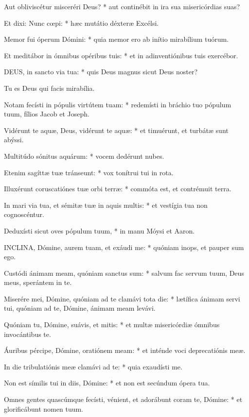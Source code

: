 Aut obliviscétur misceréri Deus? * aut continébit in ira sua misericórdias suas?

Et dixi: Nunc cœpi: * hæc mutátio déxteræ Excélsi.

Memor fui óperum Dómini: * quia memor ero ab inítio mirabílium tuórum.

Et meditábor in ómnibus opéribus tuis: * et in adinventiónibus tuis exercébor.


\lettrine[lines=2]{D}{EUS}, in sancto via tua: * quis Deus magnus sicut Deus noster?

Tu es Deus qui facis mirabília.

Notam fecísti in pópulis virtútem tuam: * redemísti in bráchio tuo pópulum tuum, fílios Jacob et Joseph.

Vidérunt te aquæ, Deus, vidérunt te aquæ: * et timuérunt, et turbátæ sunt abýssi.

Multitúdo sónitus aquárum: * vocem dedérunt nubes.

Etenim sagíttæ tuæ tránseunt: * vox tonítrui tui in rota.

Illuxérunt coruscatiónes tuæ orbi terræ: * commóta est, et contrémuit terra.

In mari via tua, et sémitæ tuæ in aquis multis: * et vestígia tua non cognoscéntur.

Deduxísti sicut oves pópulum tuum, * in manu Móysi et Aaron.


\lettrine[lines=2]{I}{NCLINA}, Dómine, aurem tuam, et exáudi me: * quóniam inops, et pauper sum ego.

Custódi ánimam meam, quóniam sanctus sum: * salvum fac servum tuum, Deus meus, sperántem in te.

Miserére mei, Dómine, quóniam ad te clamávi tota die: * lætífica ánimam servi tui, quóniam ad te, Dómine, ánimam meam levávi.

Quóniam tu, Dómine, suávis, et mitis: * et multæ misericórdiæ ómnibus invocántibus te.

Áuribus pércipe, Dómine, oratiónem meam: * et inténde voci deprecatiónis meæ.

In die tribulatiónis meæ clamávi ad te: * quia exaudísti me.

Non est símilis tui in diis, Dómine: * et non est secúndum ópera tua.

Omnes gentes quascúmque fecísti, vénient, et adorábunt coram te, Dómine: * et glorificábunt nomen tuum.

